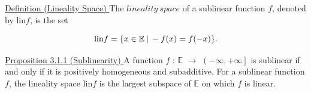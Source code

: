 \documentclass[a4paper,11pt]{jsarticle}
\begin{document}
\begin{itembox}[l]{\underline{Definition (Lineality Space) }}
  The $lineality\:space$ of a
  sublinear function $f$, denoted by lin$f$, is the set

  \begin{equation}
      \text{lin} f = \{x \in \mathbb{E}\:|\:-f(x) = f(-x)\}. \notag
  \end{equation}
\end{itembox}

\begin{center}
\end{center}

\begin{itembox}[l]{\underline{Proposition 3.1.1 (Sublinearity) }}
  A function $f$ : $\mathbb{E}$ $\to$ $ \left ( -\infty ,+\infty \right ] $ is sublinear if and only if it is positively homogeneous and subadditive. For a sublinear function $f$, the lineality space lin$f$ is the largest subspace of $\mathbb{E}$ on
which $f$ is linear.
\end{itembox}
\end{document}
